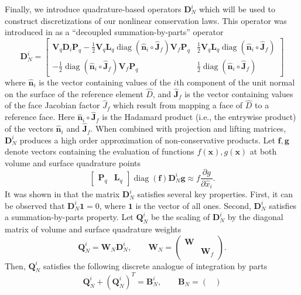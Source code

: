 \documentclass[preprint,10pt]{article}
\theoremstyle{definition}
\theoremstyle{lemma}
\theoremstyle{theorem}
\theoremstyle{assumption}
\DeclareMathOperator{\diag}{diag}
\renewcommand{\hat}{\widehat}
\newcommand{\pd}[2]{\frac{\partial#1}{\partial#2}}
\newcommand{\LRp}[1]{\left( #1 \right)}
\newcommand{\LRs}[1]{\left[ #1 \right]}
\begin{document}
{Finally, we introduce quadrature-based operators $\bm{D}_N^i$ which will be used to construct discretizations of our nonlinear conservation laws.  This operator was introduced in \cite{chan2017discretely} as a ``decoupled summation-by-parts'' operator
\begin{equation}
\bm{D}_N^i =\LRs{
\begin{array}{cc}
\bm{V}_q\bm{D}_i \bm{P}_q - \frac{1}{2}\bm{V}_q\bm{L}_q \diag\LRp{\hat{\bm{n}}_i\circ\bm{\hat{J}}_f}\bm{V}_f\bm{P}_q & \frac{1}{2}\bm{V}_q\bm{L}_q  \diag\LRp{\hat{\bm{n}}_i\circ\bm{\hat{J}}_f}\\
- \frac{1}{2}\diag\LRp{\hat{\bm{n}}_i\circ\bm{\hat{J}}_f} \bm{V}_f\bm{P}_q &  \frac{1}{2}\diag\LRp{\hat{\bm{n}}_i\circ\bm{\hat{J}}_f}
\end{array}
}
\label{eq:decoupledsbp}
\end{equation}
where $\hat{\bm{n}}_i$ is the vector containing values of the $i$th component of the unit normal on the surface of the reference element $\hat{D}$, and $\bm{\hat{J}}_f$ is the vector containing values of the face Jacobian factor $\hat{J}_f$ which result from mapping a face of $\hat{D}$ to a reference face.  Here $\hat{\bm{n}}_i\circ\bm{\hat{J}}_f$ is the Hadamard product (i.e., the entrywise product) of the vectors $\hat{\bm{n}}_i$ and $\bm{\hat{J}}_f$.  When combined with projection and lifting matrices, $\bm{D}_N^i$ produces a high order approximation of non-conservative products.  Let $\bm{f},\bm{g}$ denote vectors containing the evaluation of functions $f(\bm{x}),g(\bm{x})$ at both volume and surface quadrature points
\[
\LRs{\begin{array}{cc}\bm{P}_q & \bm{L}_q\end{array}} \diag\LRp{\bm{f}}\bm{D}_N^i \bm{g} \approx f\pd{g}{\hat{x}_i}.
\]
It was shown in \cite{chan2017discretely} that the matrix $\bm{D}_N^i$ satisfies several key properties.  First, it can be observed that $\bm{D}_N^i\bm{1} = 0$, where $\bm{1}$ is the vector of all ones.  Second, $\bm{D}_N^i$ satisfies a summation-by-parts property.  Let $\bm{Q}_N^i$ be the scaling of $\bm{D}_N^i$ by the diagonal matrix of volume and surface quadrature weights 
\[
\bm{Q}_N^i = \bm{W}_N \bm{D}_N^i, \qquad \bm{W}_N = \LRp{\begin{array}{cc}
\bm{W} &\\
& \bm{W}_f 
\end{array}}.
\]
Then, $\bm{Q}_N^i$ satisfies the following discrete analogue of integration by parts 
\begin{equation}
\bm{Q}_N^i + \LRp{\bm{Q}_N^i}^T = \bm{B}^i_N, \qquad \bm{B}_N = \LRp{\begin{array}{cc}

\end{array}}
\end{equation}}
\end{document}
